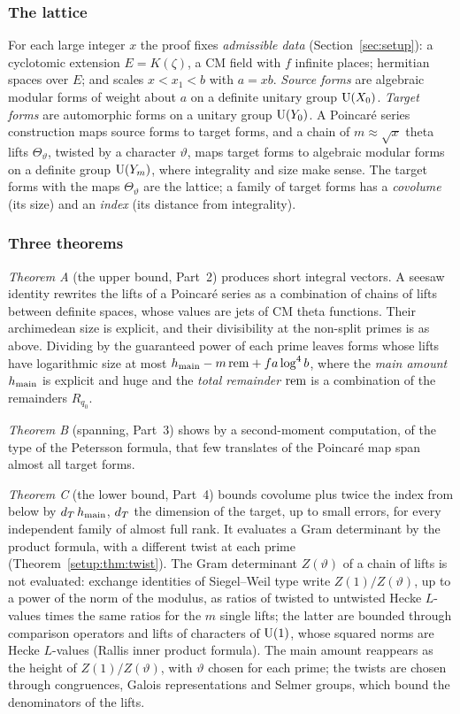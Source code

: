 \subsubsection*{The lattice}
For each large integer $x$ the proof fixes \emph{admissible data} (Section~\ref{sec:setup}): a
cyclotomic extension $E = K(\zeta)$, a CM field with $f$ infinite places; hermitian spaces over
$E$; and scales $x < x_1 < b$ with $a = xb$. \emph{Source forms} are algebraic modular forms of
weight about $a$ on a definite unitary group $\operatorname{U}(X_0)$. \emph{Target forms} are automorphic forms
on a unitary group $\operatorname{U}(Y_0)$. A Poincar\'e series construction maps source forms to target forms,
and a chain of $m \approx \sqrt{x}$ theta lifts $\Theta_\vartheta$, twisted by a character
$\vartheta$, maps target forms to algebraic modular forms on a definite group $\operatorname{U}(Y_m)$, where
integrality and size make sense. The target forms with the maps $\Theta_\vartheta$ are the
lattice; a family of target forms has a \emph{covolume} (its size) and an \emph{index} (its
distance from integrality).

\subsubsection*{Three theorems}
\emph{Theorem A} (the upper bound, Part~2) produces short integral vectors. A seesaw identity
rewrites the lifts of a Poincar\'e series as a combination of chains of lifts between definite
spaces, whose values are jets of CM theta functions. Their archimedean size is explicit, and their
divisibility at the non-split primes is as above. Dividing by the guaranteed power of each prime
leaves forms whose lifts have logarithmic size at most $h_{\mathrm{main}} - m\,\mathrm{rem} + f a\log^4 b$, where
the \emph{main amount} $h_{\mathrm{main}}$ is explicit and huge and the \emph{total remainder} $\mathrm{rem}$ is a combination of the remainders
$R_{q_0}$.

\emph{Theorem B} (spanning, Part~3) shows by a second-moment computation, of the type of the
Petersson formula, that few translates of the Poincar\'e map span almost all target forms.

\emph{Theorem C} (the lower bound, Part~4) bounds covolume plus twice the index from below by
$d_T\,h_{\mathrm{main}}$, $d_T$ the dimension of the target, up to small errors, for every independent family
of almost full rank. It evaluates a Gram determinant by the product formula, with a different
twist at each prime (Theorem~\ref{setup:thm:twist}). The Gram determinant $Z(\vartheta)$ of a
chain of lifts is not evaluated: exchange identities of Siegel--Weil type write $Z(1)/Z(\vartheta)$,
up to a power of the norm of the modulus, as ratios of twisted to untwisted Hecke $L$-values times
the same ratios for the $m$ single lifts; the latter are bounded through comparison operators and
lifts of characters of $\operatorname{U}(1)$, whose squared norms are Hecke $L$-values (Rallis inner product
formula). The main amount reappears as the height of $Z(1)/Z(\vartheta)$, with $\vartheta$ chosen
for each prime; the twists are chosen through congruences, Galois representations and Selmer
groups, which bound the denominators of the lifts.

